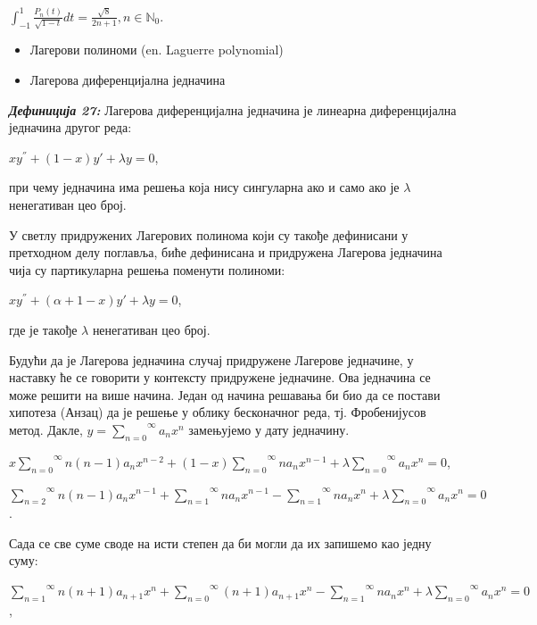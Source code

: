 \(\int_{- 1}^{1}\frac{P_{n}(t)}{\sqrt{1 - t}}dt = \frac{\sqrt{8}}{2n + 1},n \in \mathbb{N}_{0}\).

\begin{itemize}
\item
  Лагерови полиноми (en. Laguerre polynomial)
\end{itemize}

\begin{itemize}
\item
  Лагерова диференцијална једначина
\end{itemize}

\emph{\textbf{Дефиниција 27:}} Лагерова диференцијална једначина је
линеарна диференцијална једначина другог реда:

\(xy^{''} + (1 - x)y' + \lambda y = 0\),

при чему једначина има решења која нису сингуларна ако и само ако је
\(\lambda\) ненегативан цео број.

У светлу придружених Лагерових полинома који су такође дефинисани у
претходном делу поглавља, биће дефинисана и придружена Лагерова
једначина чија су партикуларна решења поменути полиноми:

\(xy^{''} + (\alpha + 1 - x)y' + \lambda y = 0\),

где је такође \(\lambda\) ненегативан цео број.

Будући да је Лагерова једначина случај придружене Лагерове једначине, у
наставку ће се говорити у контексту придружене једначине. Ова једначина
се може решити на више начина. Један од начина решавања би био да се
постави хипотеза (Анзац) да је решење у облику бесконачног реда, тј.
Фробенијусов метод. Дакле,
\(y = \overset{\infty}{\sum_{n = 0}}a_{n}x^{n}\) замењујемо у дату
једначину.

\(x\overset{\infty}{\sum_{n = 0}}n(n - 1)a_{n}x^{n - 2} + (1 - x)\overset{\infty}{\sum_{n = 0}}na_{n}x^{n - 1} + \lambda\overset{\infty}{\sum_{n = 0}}a_{n}x^{n} = 0\),

\(\overset{\infty}{\sum_{n = 2}}n(n - 1)a_{n}x^{n - 1} + \overset{\infty}{\sum_{n = 1}}na_{n}x^{n - 1} - \overset{\infty}{\sum_{n = 1}}na_{n}x^{n} + \lambda\overset{\infty}{\sum_{n = 0}}a_{n}x^{n} = 0\).

Сада се све суме своде на исти степен да би могли да их запишемо као
једну суму:

\(\overset{\infty}{\sum_{n = 1}}n(n + 1)a_{n + 1}x^{n} + \overset{\infty}{\sum_{n = 0}}(n + 1)a_{n + 1}x^{n} - \overset{\infty}{\sum_{n = 1}}na_{n}x^{n} + \lambda\overset{\infty}{\sum_{n = 0}}a_{n}x^{n} = 0\),

